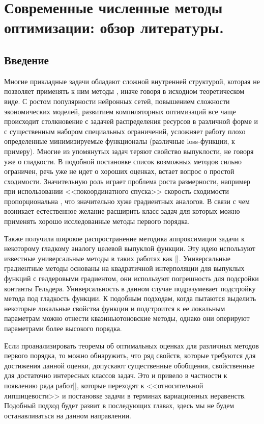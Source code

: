 \chapter{Современные численные методы оптимизации: обзор литератyры.}\label{ch:ch1}

\section{Введение}\label{sec:ch1/sec1}

  Многие прикладные задачи обладают сложной внутренней структурой, которая не позволяет применять к ним методы , иначе говоря в исходном теоретическом виде. С ростом популярности нейронных сетей, повышением сложности экономических моделей, развитием компиляторных оптимизаций все чаще происходит столкновение с задачей распределения ресурсов в различной форме и с существенным набором специальных ограничений, усложняет работу плохо определенные минимизируемые функционалы (различные loss-функции, к примеру). Многие из упомянутых задач теряют свойство выпуклости, не говоря уже о гладкости. В подобной постановке список возможных методов сильно ограничен,  речь уже не идет о хороших оценках, встает вопрос о простой сходимости. Значительную роль играет проблема роста размерности, например при использовании <<покоординатного спуска>> скорость сходимости пропорциональна , что значительно хуже градиентных аналогов. В связи с чем возникает естественное желание расширить класс задач для которых можно применять хорошо исследованные методы первого порядка. 

  Также получила широкое распространение методика аппроксимации задачи к некоторому гладкому аналогу целевой выпуклой функции. Эту идею используют известные универсальные методы в таких работах как []. Универсальные градиентные методы основаны на квадратичной интерполяции  для выпуклых функций с гелдеровыми градиентом, они используют погрешность для подсройки контанты Гельдера. Универсальность в данном случае подразумевает подстройку метода под гладкость функции. К подобным подходам, когда пытаются выделить некоторые локальные свойства функции и подстроится к ее локальным параметрам можно отнести квазиньютоновские методы, однако они оперируют параметрами более высокого порядка. 

  Если проанализировать теоремы об оптимальных оценках для различных методов первого порядка, то можно обнаружить, что ряд свойств, которые требуются для достижения данной оценки, допускают существенные обобщения, свойственные для достаточно интересных классов задач. Это и привело в частности к появлению ряда работ[], которые переходят к <<относительной липшицевости>> и постановке задачи в терминах вариационных неравенств. Подобный подход будет развит в последующих главах, здесь мы не будем останавливаться на данном направлении.

